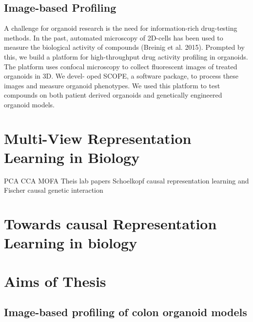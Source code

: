\begin{flushleft}
\subsection{Image-based Profiling}
A challenge for organoid research is the need for information-rich drug-testing methods. In the past, automated microscopy of 2D-cells has been used to measure the biological activity of compounds (Breinig et al. 2015). Prompted by this, we build a platform for high-throughput drug activity profiling in organoids. The platform uses confocal microscopy to collect fluorescent images of treated organoids in 3D. We devel- oped SCOPE, a software package, to process these images and measure organoid phenotypes. We used this platform to test compounds on both patient derived organoids and genetically engineered organoid models.

\section{Multi-View Representation Learning in Biology}
PCA
CCA
MOFA
Theis lab papers
Schoelkopf causal representation learning and Fischer causal genetic interaction

\section{Towards causal Representation Learning in biology}

\section{Aims of Thesis}
\subsection{Image-based profiling of colon organoid models}


\end{flushleft}
